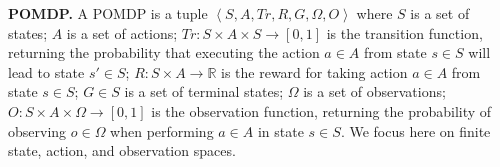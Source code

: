 \documentclass[letterpaper]{article} %
\newcommand{\tuple}[1]{\ensuremath{\left \langle #1 \right \rangle }}
\newcommand{\guy}[1]{\textcolor{blue}{[Guy: #1]}}
\newcommand{\inon}[1]{ }
\begin{document}
\noindent\textbf{POMDP.} A POMDP is a tuple $\tuple{S,A,Tr,R,G,\Omega,O}$ where
 $S$ is a set of states;
 $A$ is a set of actions;
 $Tr: S \times A \times S \rightarrow [0,1]$ is the transition function, returning the probability that executing the action $a \in A$ from state $s \in S$ will lead to state $s' \in S$;
$R: S \times A \rightarrow \mathbb{R} $ is the reward for taking action $a \in A$ from state $s \in S$;
$G \in S$ is a set of terminal states;
$\Omega$ is a set of observations;
$O:S\times A\times\Omega\rightarrow [0,1]$ is the observation function, returning the probability of observing $o\in\Omega$ when performing $a\in A$ in state $s\in S$.
We focus here on finite state, action, and observation spaces. %
\end{document}
